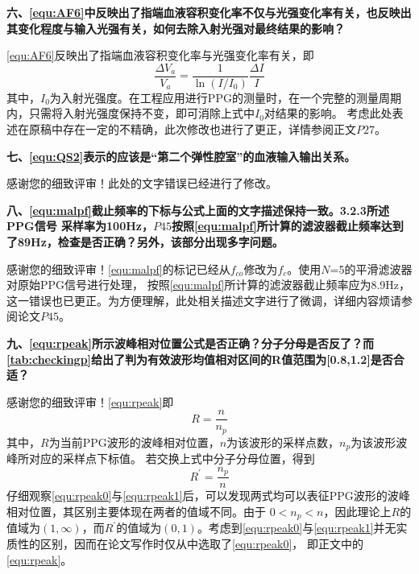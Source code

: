 \textbf{六、\autoref{equ:AF6}中反映出了指端血液容积变化率不仅与光强变化率有关，也反映出其变化程度与输入光强有关，如何去除入射光强对最终结果的影响？}

\autoref{equ:AF6}反映出了指端血液容积变化率与光强变化率有关，即
\begin{equation}
    \frac{\Delta V_{a}}{V_{a}}=\frac{1}{\ln(I/I_{0})}\frac{\Delta I}{I}
\end{equation}
其中，$I_{0}$为入射光强度。在工程应用进行PPG的测量时，在一个完整的测量周期内，只需将入射光强度保持不变，即可消除上式中$I_{0}$对结果的影响。
考虑此处表述在原稿中存在一定的不精确，此次修改也进行了更正，详情参阅正文$P27$。


\textbf{七、\autoref{equ:QS2}表示的应该是“第二个弹性腔室”的血液输入输出关系。}

感谢您的细致评审！此处的文字错误已经进行了修改。

\textbf{八、\autoref{equ:malpf}截止频率的下标与公式上面的文字描述保持一致。3.2.3所述PPG信号
采样率为100Hz，$P45$按照\autoref{equ:malpf}所计算的滤波器截止频率达到了89Hz，检查是否正确？另外，该部分出现多字问题。}

感谢您的细致评审！\autoref{equ:malpf}的标记已经从$f_{co}$修改为$f_{c}$。使用$N$=5的平滑滤波器对原始PPG信号进行处理，
按照\autoref{equ:malpf}所计算的滤波器截止频率应为8.9Hz，这一错误也已更正。为方便理解，此处相关描述文字进行了微调，详细内容烦请参阅论文$P45$。

\textbf{九、\autoref{equ:rpeak}所示波峰相对位置公式是否正确？分子分母是否反了？而\autoref{tab:checkingp}给出了判为有效波形均值相对区间的R值范围为[0.8,1.2]是否合适？}

感谢您的细致评审！\autoref{equ:rpeak}即
\begin{equation}
    \label{equ:rpeak0}
    R = \frac{n}{n_p}
\end{equation}
其中，$R$为当前PPG波形的波峰相对位置，$n$为该波形的采样点数，$n_p$为该波形波峰所对应的采样点下标值。
若交换上式中分子分母位置，得到
\begin{equation}
    \label{equ:rpeak1}
    R^{'} = \frac{n_p}{n}
\end{equation}
仔细观察\autoref{equ:rpeak0}与\autoref{equ:rpeak1}后，可以发现两式均可以表征PPG波形的波峰相对位置，其区别主要体现在两者的值域不同。由于
$0<n_p<n$，因此理论上$R$的值域为$(1, \infty)$，而$R^{'}$的值域为$(0,1)$。考虑到\autoref{equ:rpeak0}与\autoref{equ:rpeak1}并无实质性的区别，因而在论文写作时仅从中选取了\autoref{equ:rpeak0}，
即正文中的\autoref{equ:rpeak}。

